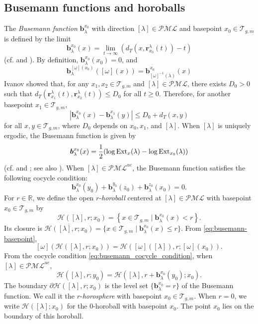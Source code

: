 \documentclass[dvipdfmx]{amsart}
\theoremstyle{remark}
\newcommand{\ext}{{\rm Ext}}
\newcommand{\teich}{\mathcal{T}}
\newcommand{\ray}{{\boldsymbol r}}
\newcommand{\pml}{\mathcal{PML}}
\newcommand{\busemann}{\boldsymbol{b}}
\newcommand{\horos}{\mathscr{H}}
\begin{document}
\subsection{Busemann functions and horoballs}
The \emph{Busemann function} $\busemann_{\lambda}^{x_0}$ with direction $[\lambda]\in \pml$ and basepoint $x_0\in \teich_{g,m}$ is defined by the limit
\[
\busemann^{x_0}_{\lambda}(x)=\lim_{t\to \infty}(d_T(x,\ray^{\lambda}_{x_0}(t))-t)
\]
(cf. \cite[\S22]{Busemann1955} and \cite[\S3]{EberleinONeill1973}).
By definition, $\busemann^{x_0}_{\lambda}(x_0)=0$, and
\begin{equation}
\label{eq:busemann-basepoint}
\busemann^{[\omega](x_0)}_{\lambda}([\omega](x))
=\busemann^{x_0}_{[\omega]^{-1}(\lambda)}(x)
\end{equation}
Ivanov \cite{Ivanov2001} showed that, for any $x_1,x_2\in \teich_{g,m}$ and $[\lambda]\in\pml$, there exists $D_0>0$ such that $d_T(\ray^\lambda_{x_1}(t),\ray^\lambda_{x_2}(t))\le D_0$ for all $t\ge 0$. Therefore, for another basepoint $x_1\in \teich_{g,m}$,
\begin{equation}
\label{eq:Busemann_function}
|\busemann^{x_0}_{\lambda}(x)-\busemann^{x_1}_{\lambda}(y)|\le D_0+d_T(x,y)
\end{equation}
for all $x,y\in \teich_{g,m}$, where $D_0$ depends on $x_0,x_1$, and $[\lambda]$.
When $[\lambda]$ is uniquely ergodic, the Busemann function is given by
\begin{equation}
\label{eq:busemann_ue}
\busemann^{x_0}_\lambda(x)=\frac{1}{2}(\log \ext_{x}(\lambda)-\log \ext_{x_0}(\lambda))
\end{equation}
(cf. \cite{LiuSu2014} and \cite{Walsh2019}; see also \cite{Miyachi2017}). When $[\lambda]\in \pml^{ue}$, the Busemann function satisfies the following cocycle condition:
\begin{equation}
\label{eq:busemann_cocycle_condition}
\busemann^{x_0}_\lambda(y_0)+\busemann^{y_0}_\lambda(z_0)+\busemann^{z_0}_\lambda(x_0)=0.
\end{equation}
For $r\in \mathbb{R}$, we define the open $r$-\emph{horoball} centered at $[\lambda]\in \pml$ with basepoint $x_0\in \teich_{g,m}$ by
\[
\horos([\lambda],r;x_0)=
\left\{x\in \teich_{g,m}\mid \busemann^{x_0}_\lambda(x)<r\right\}.
\]
Its closure is $\overline{\horos([\lambda],r;x_0)}=\{x\in \teich_{g,m}\mid \busemann^{x_0}_\lambda(x)\le r\}$.
From \eqref{eq:busemann-basepoint},
\begin{equation}
\label{eq:horoball-basepoint}
[\omega](\horos([\lambda],r;x_0))
=\horos([\omega]([\lambda]),r;[\omega](x_0)).
\end{equation}
From the cocycle condition \eqref{eq:busemann_cocycle_condition}, when $[\lambda]\in \pml^{ue}$,
\begin{equation}
\label{eq:horoball-basepoint2}
\horos([\lambda],r;y_0)
=\horos([\lambda],r+\busemann^{x_0}_\lambda(y_0);x_0).
\end{equation}
The boundary $\partial \horos([\lambda],r;x_0)$ is the level set $\{\busemann^{x_0}_\lambda=r\}$ of the Busemann function. We call it the $r$-\emph{horosphere} with basepoint $x_0\in \teich_{g,m}$. When $r=0$, we write $\horos([\lambda];x_0)$ for the $0$-horoball with basepoint $x_0$. The point $x_0$ lies on the boundary of this horoball.
\end{document}

